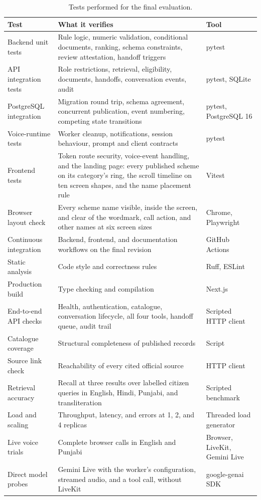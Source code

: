 \documentclass[11pt,a4paper,oneside]{report}
\begin{document}
\begin{table}[htbp]
\centering\small
\begin{tabularx}{\textwidth}{@{}P{0.27\textwidth}YP{0.17\textwidth}@{}}
\toprule
\textbf{Test} & \textbf{What it verifies} & \textbf{Tool} \\
\midrule
Backend unit tests & Rule logic, numeric validation, conditional documents,
  ranking, schema constraints, review attestation, handoff triggers & pytest \\
API integration tests & Role restrictions, retrieval, eligibility, documents,
  handoffs, conversation events, audit & pytest, SQLite \\
PostgreSQL integration & Migration round trip, schema agreement, concurrent
  publication, event numbering, competing state transitions & pytest, PostgreSQL 16 \\
Voice-runtime tests & Worker cleanup, notifications, session behaviour, prompt
  and client contracts & pytest \\
Frontend tests & Token route security, voice-event handling, and the landing
  page: every published scheme on its category's ring, the scroll timeline on ten
  screen shapes, and the name placement rule & Vitest \\
Browser layout check & Every scheme name visible, inside the screen, and clear of
  the wordmark, call action, and other names at six screen sizes & Chrome,
  Playwright \\
Continuous integration & Backend, frontend, and documentation workflows on the
  final revision & GitHub Actions \\
Static analysis & Code style and correctness rules & Ruff, ESLint \\
Production build & Type checking and compilation & Next.js \\
End-to-end API checks & Health, authentication, catalogue, conversation
  lifecycle, all four tools, handoff queue, audit trail & Scripted HTTP client \\
Catalogue coverage & Structural completeness of published records & Script \\
Source link check & Reachability of every cited official source & HTTP client \\
Retrieval accuracy & Recall at three results over labelled citizen queries in
  English, Hindi, Punjabi, and transliteration & Scripted benchmark \\
Load and scaling & Throughput, latency, and errors at 1, 2, and 4 replicas &
  Threaded load generator \\
Live voice trials & Complete browser calls in English and Punjabi & Browser,
  LiveKit, Gemini Live \\
Direct model probes & Gemini Live with the worker's configuration, streamed
  audio, and a tool call, without LiveKit & google-genai SDK \\
\bottomrule
\end{tabularx}
\caption{Tests performed for the final evaluation.}
\label{tab:tests}
\end{table}
\end{document}
